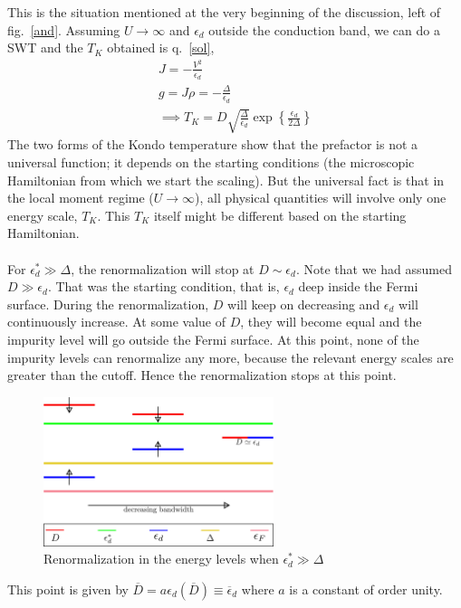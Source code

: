 \documentclass[twoside,11pt]{report}
\numberwithin{equation}{section}
\begin{document}
This is the situation mentioned at the very beginning of the discussion, left of fig.~\ref{and}.
Assuming \(U \rightarrow \infty\) and \(\epsilon_d\) outside the conduction band, we can do a SWT and the \(T_K\) obtained is q.~\ref{sol},
\begin{gather}
    J = -\frac{V^2}{\epsilon_d}\\
    g = J\rho = -\frac{\Delta}{\epsilon_d}\\
    \implies T_K = D\sqrt{\frac{\Delta}{\epsilon_d}}\exp\left\{\frac{\epsilon_d}{2\Delta}\right\}\label{jean2}
\end{gather}
The two forms of the Kondo temperature show that the prefactor is not a universal function; it depends on the starting conditions (the microscopic Hamiltonian from which we start the scaling).
But the universal fact is that in the local moment regime (\(U \rightarrow \infty\)), all physical quantities will involve only one energy scale, \(T_K\).
This \(T_K\) itself might be different based on the starting Hamiltonian.\\\\
For \(\epsilon_d^* \gg \Delta\), the renormalization will stop at \(D \sim \epsilon_d\).
Note that we had assumed \(D \gg \epsilon_d\).
That was the starting condition, that is, \(\epsilon_d\) deep inside the Fermi surface.
During the renormalization, \(D\) will keep on decreasing and \(\epsilon_d\) will continuously increase.
At some value of \(D\), they will become equal and the impurity level will go outside the Fermi surface.
At this point, none of the impurity levels can renormalize any more, because the relevant energy scales are greater than the cutoff.
Hence the renormalization stops at this point.
\begin{figure} 
	\centering 
	\includegraphics[width=0.6\textwidth]{../figures/full.png}
	\caption{Renormalization in the energy levels when \(\epsilon_d^* \gg \Delta\)}
\end{figure}
This point is given by \(\overline D = a\epsilon_d(\overline D) \equiv \overline \epsilon_d\) where \(a\) is a constant of order unity.
\end{document}
